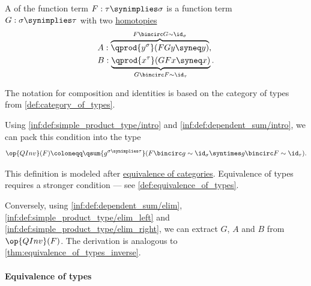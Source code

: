 \begin{definition}\label{def:arrow_type_quasi_inverse}
  A  of the function term \( F: \tau \synimplies \sigma \) is a function term \( G: \sigma \synimplies \tau \) with two \hyperref[def:homotopy_of_types]{homotopies}
  \begin{align*}
    &A: \overbrace{\qprod {y^\sigma} (FGy \syneq y)}^{F \bincirc G \sim \id_\sigma}, \\
    &B: \underbrace{\qprod {x^\tau} (GFx \syneq x)}_{G \bincirc F \sim \id_\tau}.
  \end{align*}

  The notation for composition and identities is based on the category of types from \cref{def:category_of_types}.

  Using \ref{inf:def:simple_product_type/intro} and \ref{inf:def:dependent_sum/intro}, we can pack this condition into the type
  \begin{equation*}
    \op{QInv}(F) \coloneqq \qsum {g^{\sigma \synimplies \tau}} (F \bincirc g \sim \id_\sigma \syntimes g \bincirc F \sim \id_\tau).
  \end{equation*}
\end{definition}
\begin{comments}
  \item This definition is modeled after \hyperref[def:equivalence_of_categories]{equivalence of categories}. Equivalence of types requires a stronger condition --- see \cref{def:equivalence_of_types}.

  \item Conversely, using \ref{inf:def:dependent_sum/elim}, \ref{inf:def:simple_product_type/elim_left} and \ref{inf:def:simple_product_type/elim_right}, we can extract \( G \), \( A \) and \( B \) from \( \op{QInv}(F) \). The derivation is analogous to \cref{thm:equivalence_of_types_inverse}.
\end{comments}

\paragraph{Equivalence of types}

